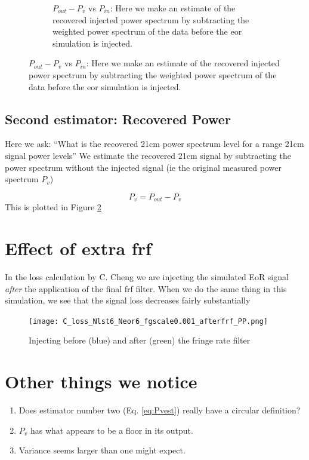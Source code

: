 \documentclass{article}
\begin{document}
\begin{figure}[bth]
\begin{center}
\begin{subfigure}{0.45\textwidth}
     \caption{$P_{out}-P_v$ vs $P_{in}$: Here we make an estimate of the recovered injected power spectrum by    subtracting the weighted power spectrum of the data before the eor simulation is injected.}\label{fig:eorvin}
   \end{subfigure}
\end{center}
\end{figure}
\subsection*{Second estimator: Recovered Power} 
Here we ask: ``What is the recovered 21cm power spectrum level for a range 21cm signal power levels''  We estimate the recovered 21cm signal by subtracting the power spectrum without the injected signal (ie the original measured power spectrum $P_{v}$)

\begin{equation}
P_{v} = P_{out} - P_v
\label{eq:Pvest}
\end{equation}
This is plotted in Figure \ref{fig:eorvin}  



\section*{Effect of extra frf}
In the loss calculation by C. Cheng we are injecting the simulated EoR signal \emph{after} the application of the final frf filter. When we do the same thing in this simulation, we see that the signal loss decreases fairly substantially
\begin{figure}[htb]
\centering
\texttt{[image: C\_loss\_Nlst6\_Neor6\_fgscale0.001\_afterfrf\_PP.png]}
\caption{Injecting before (blue) and after (green) the fringe rate filter}\label{fig:afterfrf}
\end{figure}


\section*{Other things we notice}
\begin{enumerate}
\item Does estimator number two (Eq. \ref{eq:Pvest}) really have a circular definition?
\item  $P_v$ has what appears to be a floor in its output. 
\item Variance seems larger than one might expect.
\end{enumerate}
\end{document}
